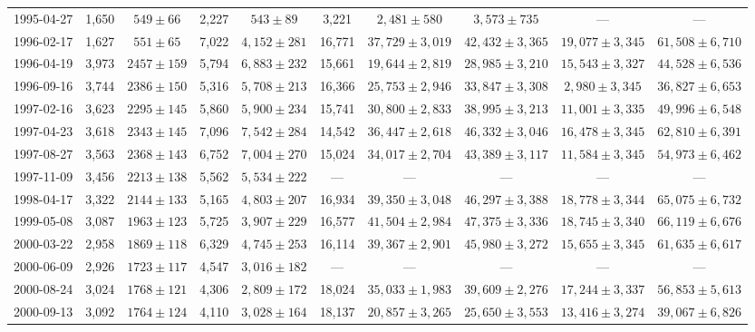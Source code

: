 \begin{landscape}
\begin{longtable}{cccccccccc}
{1995-04-27} & 1,650 & {$549  \pm  66$} & 2,227 & {$543 \pm 89$} & 3,221 & {$2,481 \pm 580$} & {$3,573 \pm 735$} & --- & --- \\
{1996-02-17} & 1,627 & {$551  \pm  65$} & 7,022 & {$4,152 \pm 281$} & 16,771 & {$37,729 \pm 3,019$} & {$42,432 \pm 3,365$} & {$19,077 \pm 3,345$} & {$61,508 \pm 6,710$} \\
{1996-04-19} & 3,973 & {$2457  \pm  159$} & 5,794 & {$6,883 \pm 232$} & 15,661 & {$19,644 \pm 2,819$} & {$28,985 \pm 3,210$} & {$15,543 \pm 3,327$} & {$44,528 \pm 6,536$} \\
{1996-09-16} & 3,744 & {$2386  \pm  150$} & 5,316 & {$5,708 \pm 213$} & 16,366 & {$25,753 \pm 2,946$} & {$33,847 \pm 3,308$} & {$2,980 \pm 3,345$} & {$36,827 \pm 6,653$} \\
{1997-02-16} & 3,623 & {$2295  \pm  145$} & 5,860 & {$5,900 \pm 234$} & 15,741 & {$30,800 \pm 2,833$} & {$38,995 \pm 3,213$} & {$11,001 \pm 3,335$} & {$49,996 \pm 6,548$} \\
{1997-04-23} & 3,618 & {$2343  \pm  145$} & 7,096 & {$7,542 \pm 284$} & 14,542 & {$36,447 \pm 2,618$} & {$46,332 \pm 3,046$} & {$16,478 \pm 3,345$} & {$62,810 \pm 6,391$} \\
{1997-08-27} & 3,563 & {$2368  \pm  143$} & 6,752 & {$7,004 \pm 270$} & 15,024 & {$34,017 \pm 2,704$} & {$43,389 \pm 3,117$} & {$11,584 \pm 3,345$} & {$54,973 \pm 6,462$} \\
{1997-11-09} & 3,456 & {$2213  \pm  138$} & 5,562 & {$5,534 \pm 222$} & --- & --- & --- & --- & --- \\
{1998-04-17} & 3,322 & {$2144  \pm  133$} & 5,165 & {$4,803 \pm 207$} & 16,934 & {$39,350 \pm 3,048$} & {$46,297 \pm 3,388$} & {$18,778 \pm 3,344$} & {$65,075 \pm 6,732$} \\
{1999-05-08} & 3,087 & {$1963  \pm  123$} & 5,725 & {$3,907 \pm 229$} & 16,577 & {$41,504 \pm 2,984$} & {$47,375 \pm 3,336$} & {$18,745 \pm 3,340$} & {$66,119 \pm 6,676$} \\
{2000-03-22} & 2,958 & {$1869  \pm  118$} & 6,329 & {$4,745 \pm 253$} & 16,114 & {$39,367 \pm 2,901$} & {$45,980 \pm 3,272$} & {$15,655 \pm 3,345$} & {$61,635 \pm 6,617$} \\
{2000-06-09} & 2,926 & {$1723  \pm  117$} & 4,547 & {$3,016 \pm 182$} & --- & --- & --- & --- & --- \\
{2000-08-24} & 3,024 & {$1768  \pm  121$} & 4,306 & {$2,809 \pm 172$} & 18,024 & {$35,033 \pm 1,983$} & {$39,609 \pm 2,276$} & {$17,244 \pm 3,337$} & {$56,853 \pm 5,613$} \\
{2000-09-13} & 3,092 & {$1764  \pm  124$} & 4,110 & {$3,028 \pm 164$} & 18,137 & {$20,857 \pm 3,265$} & {$25,650 \pm 3,553$} & {$13,416 \pm 3,274$} & {$39,067 \pm 6,826$} \\

\end{longtable}
\end{landscape}
